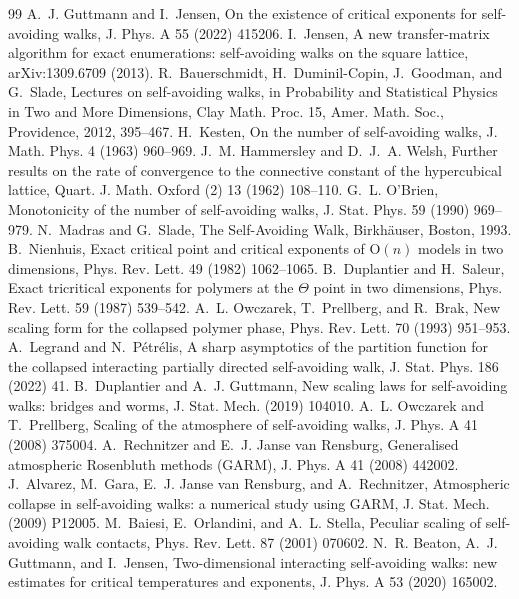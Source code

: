 \documentclass[11pt]{article}
\theoremstyle{definition}
\begin{document}
\begin{thebibliography}{99}
 A.~J. Guttmann and I.~Jensen, On the existence of critical exponents for self-avoiding walks, J. Phys. A 55 (2022) 415206.
 I.~Jensen, A new transfer-matrix algorithm for exact enumerations: self-avoiding walks on the square lattice, arXiv:1309.6709 (2013).
 R.~Bauerschmidt, H.~Duminil-Copin, J.~Goodman, and G.~Slade, Lectures on self-avoiding walks, in Probability and Statistical Physics in Two and More Dimensions, Clay Math. Proc. 15, Amer. Math. Soc., Providence, 2012, 395--467.
 H.~Kesten, On the number of self-avoiding walks, J. Math. Phys. 4 (1963) 960--969.
 J.~M. Hammersley and D.~J.~A. Welsh, Further results on the rate of convergence to the connective constant of the hypercubical lattice, Quart. J. Math. Oxford (2) 13 (1962) 108--110.
 G.~L. O'Brien, Monotonicity of the number of self-avoiding walks, J. Stat. Phys. 59 (1990) 969--979.
 N.~Madras and G.~Slade, The Self-Avoiding Walk, Birkh\"auser, Boston, 1993.
 B.~Nienhuis, Exact critical point and critical exponents of $\mathrm O(n)$ models in two dimensions, Phys. Rev. Lett. 49 (1982) 1062--1065.
 B.~Duplantier and H.~Saleur, Exact tricritical exponents for polymers at the $\Theta$ point in two dimensions, Phys. Rev. Lett. 59 (1987) 539--542.
 A.~L. Owczarek, T.~Prellberg, and R.~Brak, New scaling form for the collapsed polymer phase, Phys. Rev. Lett. 70 (1993) 951--953.
 A.~Legrand and N.~P\'etr\'elis, A sharp asymptotics of the partition function for the collapsed interacting partially directed self-avoiding walk, J. Stat. Phys. 186 (2022) 41.
 B.~Duplantier and A.~J. Guttmann, New scaling laws for self-avoiding walks: bridges and worms, J. Stat. Mech. (2019) 104010.
 A.~L. Owczarek and T.~Prellberg, Scaling of the atmosphere of self-avoiding walks, J. Phys. A 41 (2008) 375004.
 A.~Rechnitzer and E.~J. Janse van Rensburg, Generalised atmospheric Rosenbluth methods (GARM), J. Phys. A 41 (2008) 442002.
 J.~Alvarez, M.~Gara, E.~J. Janse van Rensburg, and A.~Rechnitzer, Atmospheric collapse in self-avoiding walks: a numerical study using GARM, J. Stat. Mech. (2009) P12005.
 M.~Baiesi, E.~Orlandini, and A.~L. Stella, Peculiar scaling of self-avoiding walk contacts, Phys. Rev. Lett. 87 (2001) 070602.
 N.~R. Beaton, A.~J. Guttmann, and I.~Jensen, Two-dimensional interacting self-avoiding walks: new estimates for critical temperatures and exponents, J. Phys. A 53 (2020) 165002.

\end{thebibliography}
\end{document}
